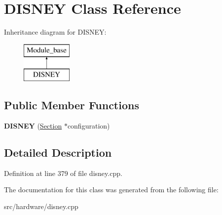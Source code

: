 \hypertarget{classDISNEY}{\section{D\-I\-S\-N\-E\-Y Class Reference}
\label{classDISNEY}
}
Inheritance diagram for D\-I\-S\-N\-E\-Y\-:\begin{figure}[H]
\begin{center}
\leavevmode
\includegraphics[height=2.000000cm]{classDISNEY}
\end{center}
\end{figure}
\subsection*{Public Member Functions}
\begin{DoxyCompactItemize}
\item 
\hypertarget{classDISNEY_ae72a1674896a0bd37efde143c97e90d5}{{\bfseries D\-I\-S\-N\-E\-Y} (\hyperlink{classSection}{Section} $\ast$configuration)}\label{classDISNEY_ae72a1674896a0bd37efde143c97e90d5}

\end{DoxyCompactItemize}


\subsection{Detailed Description}


Definition at line 379 of file disney.\-cpp.



The documentation for this class was generated from the following file\-:\begin{DoxyCompactItemize}
\item 
src/hardware/disney.\-cpp\end{DoxyCompactItemize}
